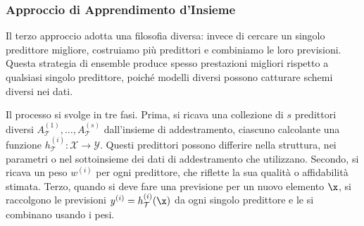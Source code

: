 \subsubsection*{Approccio di Apprendimento d'Insieme}

Il terzo approccio adotta una filosofia diversa: invece di cercare un singolo predittore migliore, costruiamo più predittori e combiniamo le loro previsioni. Questa strategia di \alert{ensemble} produce spesso prestazioni migliori rispetto a qualsiasi singolo predittore, poiché modelli diversi possono catturare schemi diversi nei dati.

Il processo si svolge in tre fasi. Prima, si ricava una collezione di $s$ predittori diversi $A^{(1)}_{\mathcal{T}}, \ldots, A^{(s)}_{\mathcal{T}}$ dall'insieme di addestramento, ciascuno calcolante una funzione $h^{(i)}_{\mathcal{T}}: \mathcal{X} \rightarrow \mathcal{Y}$. Questi predittori possono differire nella struttura, nei parametri o nel sottoinsieme dei dati di addestramento che utilizzano. Secondo, si ricava un peso $w^{(i)}$ per ogni predittore, che riflette la sua qualità o affidabilità stimata. Terzo, quando si deve fare una previsione per un nuovo elemento $\x$, si raccolgono le previsioni $y^{(i)} = h^{(i)}_{\mathcal{T}}(\x)$ da ogni singolo predittore e le si combinano usando i pesi.

